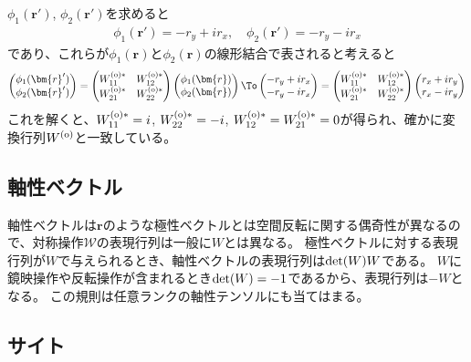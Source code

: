 \documentclass[11pt]{easymemo}
\begin{document}
$\phi_{1}(\bm{r}')$, $\phi_{2}(\bm{r}')$を求めると
\begin{align*}
  \phi_{1}(\bm{r}')=-r_{y}+ir_{x},
  \quad
  \phi_{2}(\bm{r}')=-r_{y}-ir_{x}
\end{align*}
であり、これらが$\phi_{1}(\bm{r})$と$\phi_{2}(\bm{r})$の線形結合で表されると考えると
\begin{align*}
  \begin{pmatrix}
    \phi_{1}(\bm{r}') \\ \phi_{2}(\bm{r}')
  \end{pmatrix}
  =
  \begin{pmatrix}
    W_{11}^{\rm (o)*} & W_{12}^{\rm (o)*} \\ W_{21}^{\rm (o)*} & W_{22}^{\rm (o)*}
  \end{pmatrix}
  \begin{pmatrix}
    \phi_{1}(\bm{r}) \\ \phi_{2}(\bm{r})
  \end{pmatrix}
  \To
  \begin{pmatrix}
    -r_{y}+ir_{x} \\ -r_{y}-ir_{x}
  \end{pmatrix}
  =
  \begin{pmatrix}
    W_{11}^{\rm (o)*} & W_{12}^{\rm (o)*} \\ W_{21}^{\rm (o)*} & W_{22}^{\rm (o)*}
  \end{pmatrix}
  \begin{pmatrix}
    r_{x}+ir_{y} \\ r_{x}-ir_{y}
  \end{pmatrix}
\end{align*}
これを解くと、$W_{11}^{\rm (o)*}=i$, $W_{22}^{\rm (o)*}=-i$, $W_{12}^{\rm (o)*}=W_{21}^{\rm (o)*}=0$が得られ、確かに変換行列$W^{\rm (o)}$と一致している。


\subsection{軸性ベクトル}

軸性ベクトルは$\bm{r}$のような極性ベクトルとは空間反転に関する偶奇性が異なるので、対称操作$\mathcal{W}$の表現行列は一般に$W$とは異なる。
極性ベクトルに対する表現行列が$W$で与えられるとき、軸性ベクトルの表現行列は${\rm det}(W)W$である。
$W$に鏡映操作や反転操作が含まれるとき${\rm det}(W)=-1$であるから、表現行列は$-W$となる。
この規則は任意ランクの軸性テンソルにも当てはまる。


\subsection{サイト}
\end{document}
